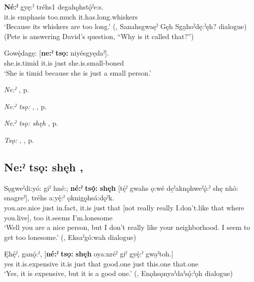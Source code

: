 \ea
\label{ex:npar94}
\gll \textbf{Né:ˀ} gyę:ˀ tréhs⁠1 degahǫ̱hstǫ́ˀe:s. \\
it.is emphasis too.much it.has.long.whiskers\\
\glt ‘Because its whiskers are too long.’ (\cite[317]{mithun_watewayestanih_1984}, Sanahsgwaęˀ Gęh Sga̱hoˀdę:ˀęh? dialogue) (Pete is answering David’s question, “Why is it called that?”)
\z

\ea
\label{ex:npar95}
\gll Gowę́dagę: [\textbf{ne:ˀ} \textbf{tsǫ:} niyésgyędaˀ]. \\
she.is.timid it.is just she.is.small-boned\\
\glt ‘She is timid because she is just a small person.’
\z

\begin{CayugaRelated}
\item \textit{Ne:ˀ} , p. \pageref{p:[ne:ˀ] `it is’}\\
\item \textit{Ne:ˀ tsǫ:} , , p. \pageref{p:[ne:ˀ tsǫ:] ‘that’s only’}\\
\item \textit{Ne:ˀ tsǫ: shęh} , p. \pageref{p:[ne:ˀ tsǫ: shęh]}\\
\item \textit{Tsǫ:} , , p. \pageref{p:[tsǫ:]}
\end{CayugaRelated}

\subsection*{\textbf{Ne:ˀ tsǫ: shęh} , } \label{p:[ne:ˀ tsǫ: shęh]}

\ea
\label{ex:npar96}
\gll Sǫgweˀdi:yó: giˀ hné:; \textbf{né:ˀ} \textbf{tsǫ́:} \textbf{shęh} [tę́ˀ gwahs ǫ:wé de̱ˀaknǫ̱hweˀǫ́:ˀ shę nhó: snagreˀ], tréhs a:yę́:ˀ ǫknigǫ̱hsá:dǫˀk. \\
you.are.nice just in.fact, it.is just that [not really really I.don’t.like that where you.live], too it.seems I’m.lonesome\\
\glt ‘Well you are a nice person, but I don’t really like your neighborhood. I seem to get too lonesome.’ (\cite[88]{mithun_watewayestanih_1984}, Eksaˀgó:wah dialogue)
\z

\ea
\label{ex:npar97}
\gll Ęhę́ˀ, ganǫ́:ˀ, [\textbf{né:ˀ} \textbf{tsǫ:} \textbf{shęh} oya:nréˀ giˀ gyę́:ˀ gwa̱ˀtoh.] \\
yes it.is.expensive it.is just that good.one just this.one that.one\\
\glt ‘Yes, it is expensive, but it is a good one.’ (\cite[159]{mithun_watewayestanih_1984}, Enǫhsǫnyaˀdaˀsǫ́:ˀǫh dialogue)
\z


